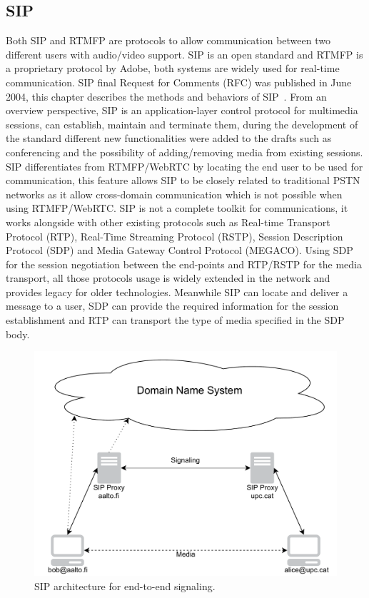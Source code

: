 \subsection{SIP}

Both SIP and RTMFP are protocols to allow communication between two different users with audio/video support. SIP is an open standard and RTMFP is a proprietary protocol by Adobe, both systems are widely used for real-time communication. SIP final Request for Comments (RFC) was published in June 2004, this chapter describes the methods and behaviors of SIP~\cite{sipRFC}. From an overview perspective, SIP is an application-layer control protocol for multimedia sessions, can establish, maintain and terminate them, during the development of the standard different new functionalities were added to the drafts such as conferencing and the possibility of adding/removing media from existing sessions. SIP differentiates from RTMFP/WebRTC by locating the end user to be used for communication, this feature allows SIP to be closely related to traditional PSTN networks as it allow cross-domain communication which is not possible when using RTMFP/WebRTC. SIP is not a complete toolkit for communications, it works alongside with other existing protocols such as Real-time Transport Protocol (RTP), Real-Time Streaming Protocol (RSTP), Session Description Protocol (SDP) and Media Gateway Control Protocol (MEGACO). Using SDP for the session negotiation between the end-points and RTP/RSTP for the media transport, all those protocols usage is widely extended in the network and provides legacy for older technologies. Meanwhile SIP can locate and deliver a message to a user, SDP can provide the required information for the session establishment and RTP can transport the type of media specified in the SDP body.

\begin{figure}[h]
  \centering
    \includegraphics[width=1\textwidth]{./figures/SIParchitecture.pdf}
      \caption[SIP architecture for end-to-end signaling]{SIP architecture for end-to-end signaling.}
	\label{fig:SIParchitecture}
\end{figure}

